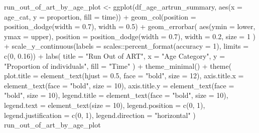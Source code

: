 \documentclass[
  letterpaper,
  DIV=11,
  numbers=noendperiod]{scrartcl}
\newenvironment{Shaded}{\begin{snugshade}}{\end{snugshade}}
\newcommand{\AttributeTok}[1]{\textcolor[rgb]{0.40,0.45,0.13}{#1}}
\newcommand{\DecValTok}[1]{\textcolor[rgb]{0.68,0.00,0.00}{#1}}
\newcommand{\FloatTok}[1]{\textcolor[rgb]{0.68,0.00,0.00}{#1}}
\newcommand{\FunctionTok}[1]{\textcolor[rgb]{0.28,0.35,0.67}{#1}}
\newcommand{\NormalTok}[1]{\textcolor[rgb]{0.00,0.23,0.31}{#1}}
\newcommand{\OtherTok}[1]{\textcolor[rgb]{0.00,0.23,0.31}{#1}}
\newcommand{\SpecialCharTok}[1]{\textcolor[rgb]{0.37,0.37,0.37}{#1}}
\newcommand{\StringTok}[1]{\textcolor[rgb]{0.13,0.47,0.30}{#1}}
\begin{document}
\begin{Shaded}
\begin{Highlighting}[]
\NormalTok{run\_out\_of\_art\_by\_age\_plot }\OtherTok{\textless{}{-}} \FunctionTok{ggplot}\NormalTok{(df\_age\_artrun\_summary, }\FunctionTok{aes}\NormalTok{(}\AttributeTok{x =}\NormalTok{ age\_cat, }\AttributeTok{y =}\NormalTok{ proportion, }\AttributeTok{fill =}\NormalTok{ time)) }\SpecialCharTok{+}
  \FunctionTok{geom\_col}\NormalTok{(}\AttributeTok{position =} \FunctionTok{position\_dodge}\NormalTok{(}\AttributeTok{width =} \FloatTok{0.7}\NormalTok{), }\AttributeTok{width =} \FloatTok{0.5}\NormalTok{) }\SpecialCharTok{+}
  \FunctionTok{geom\_errorbar}\NormalTok{(}
    \FunctionTok{aes}\NormalTok{(}\AttributeTok{ymin =}\NormalTok{ lower, }\AttributeTok{ymax =}\NormalTok{ upper),}
    \AttributeTok{position =} \FunctionTok{position\_dodge}\NormalTok{(}\AttributeTok{width =} \FloatTok{0.7}\NormalTok{),}
    \AttributeTok{width =} \FloatTok{0.2}\NormalTok{,}
    \AttributeTok{size =} \DecValTok{1}
\NormalTok{  ) }\SpecialCharTok{+}
  \FunctionTok{scale\_y\_continuous}\NormalTok{(}\AttributeTok{labels =}\NormalTok{ scales}\SpecialCharTok{::}\FunctionTok{percent\_format}\NormalTok{(}\AttributeTok{accuracy =} \DecValTok{1}\NormalTok{), }\AttributeTok{limits =} \FunctionTok{c}\NormalTok{(}\DecValTok{0}\NormalTok{, }\FloatTok{0.16}\NormalTok{)) }\SpecialCharTok{+}
  \FunctionTok{labs}\NormalTok{(}
    \AttributeTok{title =} \StringTok{"Run Out of ART"}\NormalTok{,}
    \AttributeTok{x =} \StringTok{"Age Category"}\NormalTok{,}
    \AttributeTok{y =} \StringTok{"Proportion of individuals"}\NormalTok{,}
    \AttributeTok{fill =} \StringTok{"Time"}
\NormalTok{  ) }\SpecialCharTok{+}
  \FunctionTok{theme\_minimal}\NormalTok{() }\SpecialCharTok{+}
  \FunctionTok{theme}\NormalTok{(}
    \AttributeTok{plot.title =} \FunctionTok{element\_text}\NormalTok{(}\AttributeTok{hjust =} \FloatTok{0.5}\NormalTok{, }\AttributeTok{face =} \StringTok{"bold"}\NormalTok{, }\AttributeTok{size =} \DecValTok{12}\NormalTok{),}
    \AttributeTok{axis.title.x =} \FunctionTok{element\_text}\NormalTok{(}\AttributeTok{face =} \StringTok{"bold"}\NormalTok{, }\AttributeTok{size =} \DecValTok{10}\NormalTok{),}
    \AttributeTok{axis.title.y =} \FunctionTok{element\_text}\NormalTok{(}\AttributeTok{face =} \StringTok{"bold"}\NormalTok{, }\AttributeTok{size =} \DecValTok{10}\NormalTok{),}
    \AttributeTok{legend.title =} \FunctionTok{element\_text}\NormalTok{(}\AttributeTok{face =} \StringTok{"bold"}\NormalTok{, }\AttributeTok{size =} \DecValTok{10}\NormalTok{),}
    \AttributeTok{legend.text =} \FunctionTok{element\_text}\NormalTok{(}\AttributeTok{size =} \DecValTok{10}\NormalTok{),}
    \AttributeTok{legend.position =} \FunctionTok{c}\NormalTok{(}\DecValTok{0}\NormalTok{, }\DecValTok{1}\NormalTok{),}
    \AttributeTok{legend.justification =} \FunctionTok{c}\NormalTok{(}\DecValTok{0}\NormalTok{, }\DecValTok{1}\NormalTok{),}
    \AttributeTok{legend.direction =} \StringTok{"horizontal"}
\NormalTok{  )}
\NormalTok{run\_out\_of\_art\_by\_age\_plot}
\end{Highlighting}
\end{Shaded}
\end{document}
